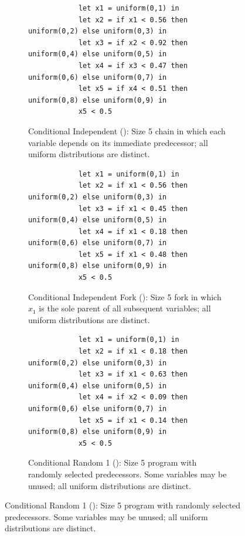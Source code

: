 \begin{figure}
    \centering
    \begin{subfigure}{\textwidth}
        \begin{lstlisting}
            let x1 = uniform(0,1) in
            let x2 = if x1 < 0.56 then uniform(0,2) else uniform(0,3) in
            let x3 = if x2 < 0.92 then uniform(0,4) else uniform(0,5) in
            let x4 = if x3 < 0.47 then uniform(0,6) else uniform(0,7) in
            let x5 = if x4 < 0.51 then uniform(0,8) else uniform(0,9) in
            x5 < 0.5
        \end{lstlisting}
        \caption{Conditional Independent (): Size 5 chain in which each variable depends on its immediate predecessor; all uniform distributions are distinct.}
        \label{fig:cond-benchmarks-a-example}
    \end{subfigure}
    \begin{subfigure}{\textwidth}
        \begin{lstlisting}
            let x1 = uniform(0,1) in
            let x2 = if x1 < 0.56 then uniform(0,2) else uniform(0,3) in
            let x3 = if x1 < 0.45 then uniform(0,4) else uniform(0,5) in
            let x4 = if x1 < 0.18 then uniform(0,6) else uniform(0,7) in
            let x5 = if x1 < 0.48 then uniform(0,8) else uniform(0,9) in
            x5 < 0.5
        \end{lstlisting}
        \caption{Conditional Independent Fork (): Size 5 fork in which $x_1$ is the sole parent of all subsequent variables; all uniform distributions are distinct.}
        \label{fig:cond-benchmarks-b-example}
    \end{subfigure}
    \begin{subfigure}{\textwidth}
        \begin{lstlisting}
            let x1 = uniform(0,1) in
            let x2 = if x1 < 0.18 then uniform(0,2) else uniform(0,3) in
            let x3 = if x1 < 0.63 then uniform(0,4) else uniform(0,5) in
            let x4 = if x2 < 0.09 then uniform(0,6) else uniform(0,7) in
            let x5 = if x1 < 0.14 then uniform(0,8) else uniform(0,9) in
            x5 < 0.5
        \end{lstlisting}
        \caption{Conditional Random 1 (): Size 5 program with randomly selected predecessors. Some variables may be unused; all uniform distributions are distinct.}
        \label{fig:cond-benchmarks-c-example}
    \end{subfigure}

\end{figure}
